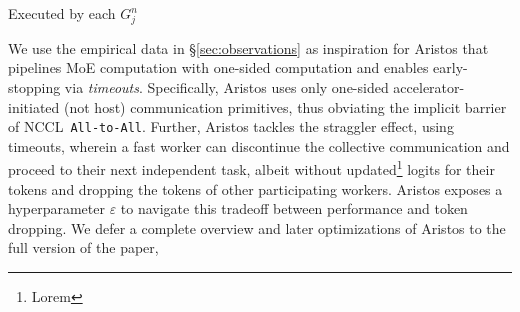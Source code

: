 \begin{algorithm}[!h]
    \DontPrintSemicolon
    \scriptsize
    \caption{Executed by each $G_j^n$}\label{alg:two}
\end{algorithm}
We use the empirical data in \S\ref{sec:observations} as inspiration for Aristos that pipelines
MoE computation with one-sided computation and enables early-stopping via \emph{timeouts}.
Specifically, Aristos uses only one-sided accelerator-initiated (not host) communication primitives,
thus obviating the implicit barrier of NCCL~\verb|All-to-All|.
Further, Aristos tackles the straggler effect, using timeouts, wherein a fast worker can discontinue the
collective communication and proceed to their next independent task,
albeit without updated\footnote{Lorem} logits for their tokens and dropping the tokens of other participating workers.
Aristos exposes a hyperparameter $\varepsilon$ to navigate this tradeoff between performance and token dropping.
We defer a complete overview and later optimizations of Aristos to the full version of the paper,

